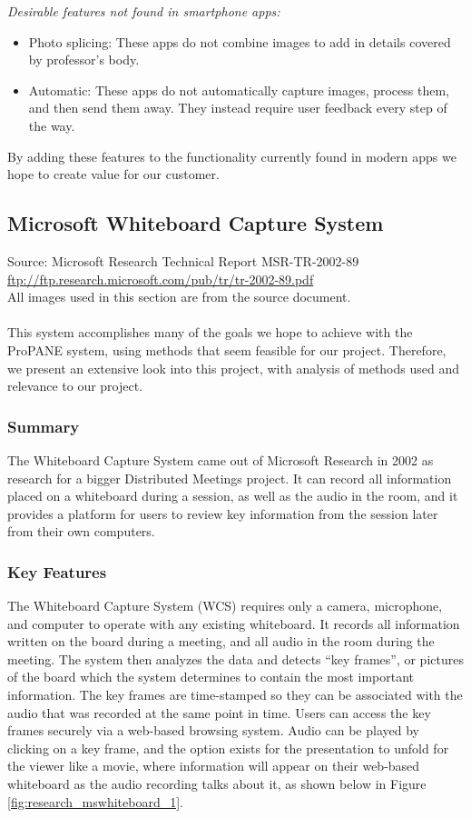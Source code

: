 \documentclass{article}
\begin{document}
        \emph{Desirable features not found in smartphone apps:}
        \begin{itemize} \itemsep -2pt
            \item Photo splicing: These apps do not combine images to add in details covered by professor's body.
            \item Automatic: These apps do not automatically capture images, process them, and then send them away. They instead require user feedback every step of the way.
        \end{itemize}

By adding these features to the functionality currently found in modern apps we hope to create value for our customer.


			\subsection*{Microsoft Whiteboard Capture System}
Source: Microsoft Research Technical Report MSR-TR-2002-89 \\
{\color{red} \url{ftp://ftp.research.microsoft.com/pub/tr/tr-2002-89.pdf}} \\
All images used in this section are from the source document. \\ \\
This system accomplishes many of the goals we hope to achieve with the ProPANE system, using methods that seem feasible for our project.  Therefore, we present an extensive look into this project, with analysis of methods used and relevance to our project.
		\subsubsection*{Summary}
The Whiteboard Capture System came out of Microsoft Research in 2002 as research for a bigger Distributed Meetings project.  It can record all information placed on a whiteboard during a session, as well as the audio in the room, and it provides a platform for users to review key information from the session later from their own computers.  
	
		\subsubsection*{Key Features}
The Whiteboard Capture System (WCS) requires only a camera, microphone, and computer to operate with any existing whiteboard.  It records all information written on the board during a meeting, and all audio in the room during the meeting.  The system then analyzes the data and detects ``key frames'', or pictures of the board which the system determines to contain the most important information.  The key frames are time-stamped so they can be associated with the audio that was recorded at the same point in time.  Users can access the key frames securely via a web-based browsing system.  Audio can be played by clicking on a key frame, and the option exists for the presentation to unfold for the viewer like a movie, where information will appear on their web-based whiteboard as the audio recording talks about it, as shown below in Figure \ref{fig:research_mswhiteboard_1}.
    
\end{document}
